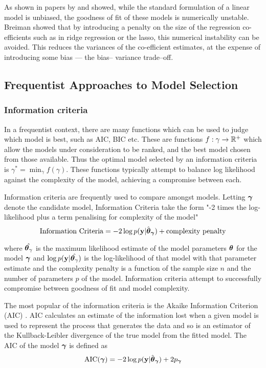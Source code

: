 As shown in papers by \citep{Breiman1996} and \citep{Efron2013} showed, while the standard formulation of a
linear model is unbiased, the goodness of fit of these models is numerically  unstable. Breiman showed that by
introducing a penalty on the size of the regression co- efficients such as  in ridge regression or the lasso,
this numerical instability can be avoided. This reduces the variances of the co-efficient estimates, at the
expense of introducing some bias --- the bias-- variance trade--off.

\subsection{Frequentist Approaches to Model Selection}
\subsubsection{Information criteria}
In a frequentist context, there are many functions which can be used to judge which model is best, such as
AIC, BIC etc. These are functions $f: \gamma \to {\mathbb{R}}^+$ which allow the models under consideration to be
ranked, and the best model chosen from those available. Thus the optimal model selected by an information
criteria is $\gamma^* = \min_\gamma f(\gamma)$. These functions typically attempt to balance log likelihood
against the complexity of the model, achieving a compromise between each.


Information criteria are frequently used to compare amongst models. Letting ${\boldsymbol \gamma}$ denote the candidate model,
Information Criteria take the form "-2 times the log-likelihood plus a term penalising for complexity of
the model"
$$
	\text{Information Criteria} = -2 \log p({\bf y} | \hat{{\boldsymbol \theta}}_{\boldsymbol \gamma}) + \text{complexity penalty}
$$

\noindent where $\hat{{\boldsymbol \theta}_\gamma}$ is the maximum likelihood estimate of the model parameters ${\boldsymbol \theta}$
for the model ${\boldsymbol \gamma}$ and $\log p({\bf y} | \hat{{\boldsymbol \theta}_\gamma})$ is the log-likelihood of that model with that
parameter estimate and the complexity penalty is a function of the sample size $n$ and the number of
parameters $p$ of the model. Information criteria attempt to successfully compromise between goodness of fit
and model complexity.

The most popular of the information criteria is the Akaike Information Criterion (AIC) \citep{Akaike1974}. AIC
calculates an estimate of the information lost when a given model is used to represent the process that
generates the data and so is an estimator of the Kullback-Leibler divergence of the true model from the fitted
model. The AIC of the model ${\boldsymbol \gamma}$ is defined as
$$
	\text{AIC}({\boldsymbol \gamma}) = -2 \log p({\bf y} | \hat{{\boldsymbol \theta}}_{\boldsymbol \gamma}) + 2 p_{\boldsymbol \gamma}
$$

